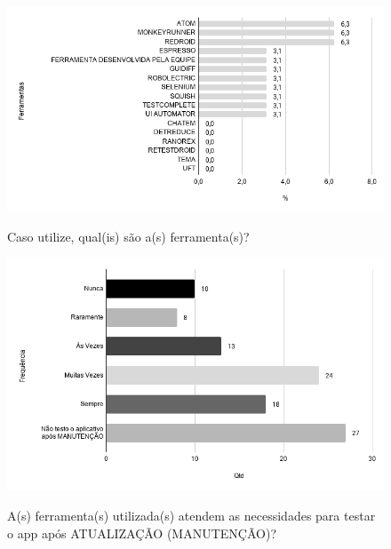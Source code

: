     
        \begin{figure}[!htb]
        \centering
        \includegraphics[width=.80\textwidth]{images/s_ferramentastestenovo.png}
        \label{figure:s_ferramentastestenovo}
        \caption{Caso utilize, qual(is) são a(s) ferramenta(s)?}
        \end{figure}
    
    
        \begin{figure}[!htb]
        \centering
        \includegraphics[width=.80\textwidth]{images/s_ferramentasexpectativas.png}
        \label{figure:s_ferramentasexpectativas}
        \caption{A(s) ferramenta(s) utilizada(s) atendem as necessidades para testar o app após ATUALIZAÇÃO (MANUTENÇÃO)?}
        \end{figure}
    
    
    
